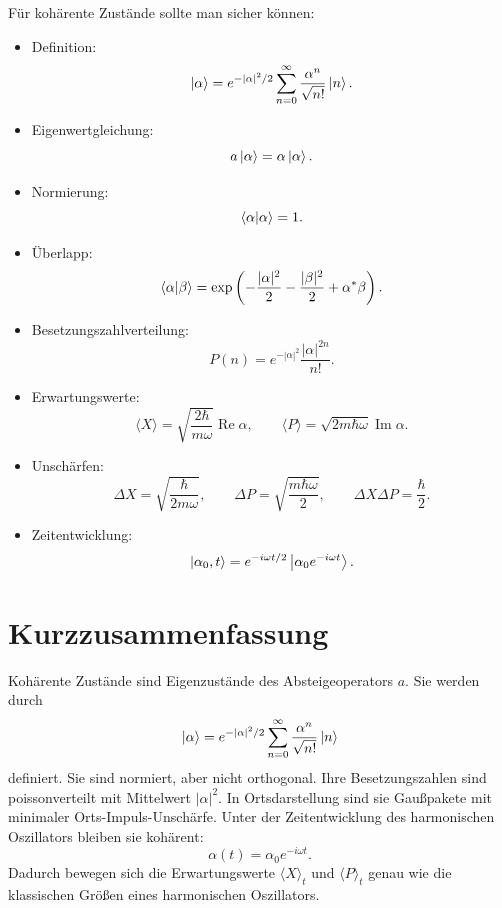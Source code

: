 \begin{examtipbox}
Für kohärente Zustände sollte man sicher können:
\begin{itemize}
    \item Definition:
    \[
        \left|\alpha\right\rangle=e^{-|\alpha|^2/2}\sum_{n=0}^{\infty}\frac{\alpha^n}{\sqrt{n!}}\left|n\right\rangle.
    \]
    \item Eigenwertgleichung:
    \[
        a\left|\alpha\right\rangle=\alpha\left|\alpha\right\rangle.
    \]
    \item Normierung:
    \[
        \left\langle\alpha\middle|\alpha\right\rangle=1.
    \]
    \item Überlapp:
    \[
        \left\langle\alpha\middle|\beta\right\rangle=\exp\left(-\frac{|\alpha|^2}{2}-\frac{|\beta|^2}{2}+\alpha^*\beta\right).
    \]
    \item Besetzungszahlverteilung:
    \[
        P(n)=e^{-|\alpha|^2}\frac{|\alpha|^{2n}}{n!}.
    \]
    \item Erwartungswerte:
    \[
        \langle X\rangle=\sqrt{\frac{2\hbar}{m\omega}}\operatorname{Re}\alpha,
        \qquad
        \langle P\rangle=\sqrt{2m\hbar\omega}\operatorname{Im}\alpha.
    \]
    \item Unschärfen:
    \[
        \Delta X=\sqrt{\frac{\hbar}{2m\omega}},
        \qquad
        \Delta P=\sqrt{\frac{m\hbar\omega}{2}},
        \qquad
        \Delta X\Delta P=\frac{\hbar}{2}.
    \]
    \item Zeitentwicklung:
    \[
        \left|\alpha_0,t\right\rangle=e^{-i\omega t/2}\left|\alpha_0e^{-i\omega t}\right\rangle.
    \]
\end{itemize}
\end{examtipbox}

\section{Kurzzusammenfassung}

\begin{answerbox}
Kohärente Zustände sind Eigenzustände des Absteigeoperators \(a\). Sie werden durch
\[
    \left|\alpha\right\rangle=e^{-|\alpha|^2/2}\sum_{n=0}^{\infty}\frac{\alpha^n}{\sqrt{n!}}\left|n\right\rangle
\]
definiert. Sie sind normiert, aber nicht orthogonal. Ihre Besetzungszahlen sind poissonverteilt mit Mittelwert \(|\alpha|^2\). In Ortsdarstellung sind sie Gaußpakete mit minimaler Orts-Impuls-Unschärfe. Unter der Zeitentwicklung des harmonischen Oszillators bleiben sie kohärent:
\[
    \alpha(t)=\alpha_0e^{-i\omega t}.
\]
Dadurch bewegen sich die Erwartungswerte \(\langle X\rangle_t\) und \(\langle P\rangle_t\) genau wie die klassischen Größen eines harmonischen Oszillators.
\end{answerbox}
